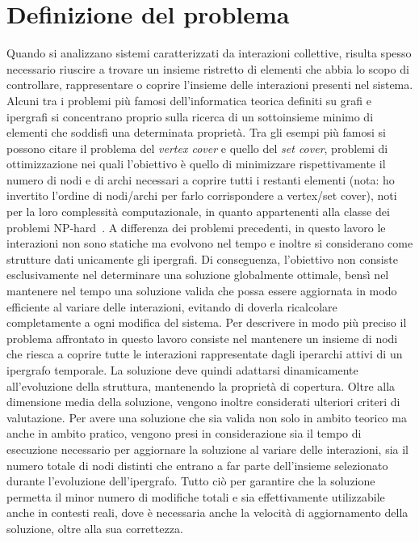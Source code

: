 
\section{Definizione del problema}\label{sec:definizione_del_problema}

Quando si analizzano sistemi caratterizzati da interazioni collettive, risulta spesso necessario riuscire a trovare un insieme ristretto di elementi che abbia lo scopo di controllare, rappresentare o coprire l'insieme delle interazioni presenti nel sistema.
Alcuni tra i problemi più famosi dell'informatica teorica definiti su grafi e ipergrafi si concentrano proprio sulla ricerca di un sottoinsieme minimo di elementi che soddisfi una determinata proprietà.
Tra gli esempi più famosi si possono citare il problema del \textit{vertex cover} e quello del \textit{set cover}, problemi di ottimizzazione nei quali l'obiettivo è quello di minimizzare rispettivamente il numero di nodi e di archi necessari a coprire tutti i restanti elementi (nota: ho invertito l'ordine di nodi/archi per farlo corrispondere a vertex/set cover), noti per la loro complessità computazionale, in quanto appartenenti alla classe dei problemi NP-hard~\cite{garey1979,gomes2006}.
A differenza dei problemi precedenti, in questo lavoro le interazioni non sono statiche ma evolvono nel tempo e inoltre si considerano come strutture dati unicamente gli ipergrafi.
Di conseguenza, l'obiettivo non consiste esclusivamente nel determinare una soluzione globalmente ottimale, bensì nel mantenere nel tempo una soluzione valida che possa essere aggiornata in modo efficiente al variare delle interazioni, evitando di doverla ricalcolare completamente a ogni modifica del sistema.
Per descrivere in modo più preciso il problema affrontato in questo lavoro consiste nel mantenere un insieme di nodi che riesca a coprire tutte le interazioni rappresentate dagli iperarchi attivi di un ipergrafo temporale.
La soluzione deve quindi adattarsi dinamicamente all'evoluzione della struttura, mantenendo la proprietà di copertura.
Oltre alla dimensione media della soluzione, vengono inoltre considerati ulteriori criteri di valutazione.
Per avere una soluzione che sia valida non solo in ambito teorico ma anche in ambito pratico, vengono presi in considerazione sia il tempo di esecuzione necessario per aggiornare la soluzione al variare delle interazioni, sia il numero totale di nodi distinti che entrano a far parte dell'insieme selezionato durante l'evoluzione dell'ipergrafo.
Tutto ciò per garantire che la soluzione permetta il minor numero di modifiche totali e sia effettivamente utilizzabile anche in contesti reali, dove è necessaria anche la velocità di aggiornamento della soluzione, oltre alla sua correttezza.